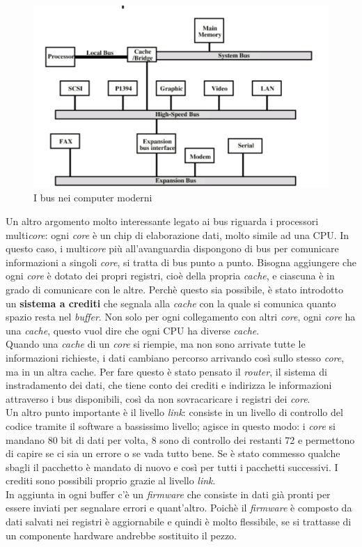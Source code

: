 \documentclass{article}
\begin{document}
\begin{figure}[h]
	\centering
	\includegraphics[scale=0.3]{immagini/bus_immagine_esemplificativa}
	\caption{I bus nei computer moderni}
\end{figure}

Un altro argomento molto interessante legato ai bus riguarda i processori multi\textit{core}: ogni \textit{core} è un chip di elaborazione dati, molto simile ad una CPU.
In questo caso, i multi\textit{core} più all'avanguardia dispongono di bus per comunicare informazioni a singoli \textit{core}, si tratta di bus punto a punto. Bisogna aggiungere che ogni \textit{core} è dotato dei propri registri, cioè della propria \textit{cache}, e ciascuna è in grado di comunicare con le altre. Perchè questo sia possibile, è stato introdotto un \textbf{sistema a crediti} che segnala alla \textit{cache} con la quale si comunica quanto spazio resta nel \textit{buffer}. Non solo per ogni collegamento con altri \textit{core}, ogni \textit{core} ha una \textit{cache}, questo vuol dire che ogni CPU ha diverse \textit{cache}. \\
Quando una \textit{cache} di un \textit{core} si riempie, ma non sono arrivate tutte le informazioni richieste, i dati cambiano percorso arrivando così sullo stesso \textit{core}, ma in un altra cache. Per fare questo è stato pensato il \textit{router}, il sistema di instradamento dei dati, che tiene conto dei crediti e indirizza le informazioni attraverso i bus disponibili, così da non sovracaricare i registri dei \textit{core}.\\
Un altro punto importante è il livello \textit{link}: consiste in un livello di controllo del codice tramite il software a bassissimo livello; agisce in questo modo: i \textit{core} si mandano 80 bit di dati per volta, 8 sono di controllo dei restanti 72 e permettono di capire se ci sia un errore o se vada tutto bene. Se è stato commesso qualche sbagli il pacchetto è mandato di nuovo e così per tutti i pacchetti successivi. I crediti sono possibili proprio grazie al livello \textit{link}.\\
In aggiunta in ogni buffer c'è un \textit{firmware} che consiste in dati già pronti per essere inviati per segnalare errori e quant'altro. Poichè il \textit{firmware} è composto da dati salvati nei registri è aggiornabile e quindi è molto flessibile, se si trattasse di un componente hardware andrebbe sostituito il pezzo.
\end{document}
